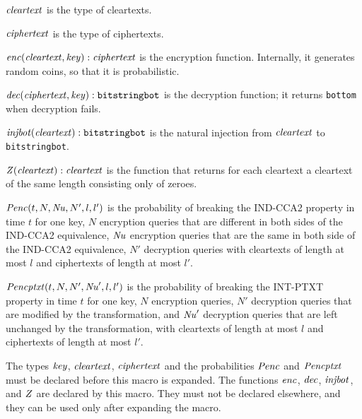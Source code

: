 \documentclass{article}
\begin{document}
\begin{itemize}
   $\mathit{cleartext}$ is the type of cleartexts.

   $\mathit{ciphertext}$ is the type of ciphertexts.

   $\mathit{enc}(\mathit{cleartext}, \mathit{key}): \mathit{ciphertext}$ is the encryption function. Internally, it generates random coins, so that it is probabilistic.

   $\mathit{dec}(\mathit{ciphertext}, \mathit{key}): \texttt{bitstringbot}$ is the
  decryption function; it returns \texttt{bottom} when decryption
  fails.

   $\mathit{injbot}(\mathit{cleartext}): \texttt{bitstringbot}$ is the natural
  injection from $\mathit{cleartext}$ to \texttt{bitstringbot}.

   $\mathit{Z}(\mathit{cleartext}): \mathit{cleartext}$ is the function that
  returns for each cleartext a cleartext of the same length consisting
  only of zeroes.

  $\mathit{Penc}(t, N, \mathit{Nu}, N', l, l')$ is the probability of breaking the
  IND-CCA2 property in time $t$ for one key, $N$ encryption queries that are 
  different in both sides of the IND-CCA2 equivalence, 
  $\mathit{Nu}$ encryption queries that are the same in both side of the IND-CCA2 equivalence, $N'$
  decryption queries with cleartexts of length at most $l$ and
  ciphertexts of length at most $l'$.

  $\mathit{Pencptxt}(t, N, N', \mathit{Nu}', l, l')$ is the probability of breaking the
  INT-PTXT property in time $t$ for one key, $N$ encryption queries, $N'$
  decryption queries that are modified by the transformation, and 
  $\mathit{Nu}'$ decryption queries that are left unchanged by the transformation,
  with cleartexts of length at most $l$ and
  ciphertexts of length at most $l'$.

   The types $\mathit{key}$, $\mathit{cleartext}$,
   $\mathit{ciphertext}$ and the probabilities $\mathit{Penc}$ and $\mathit{Pencptxt}$ must
   be declared before this macro is expanded. The functions
   $\mathit{enc}$, $\mathit{dec}$, $\mathit{injbot}$, and $\mathit{Z}$ are declared by this
   macro. They must not be declared elsewhere, and they can be used
   only after expanding the macro.


\end{itemize}
\end{document}
